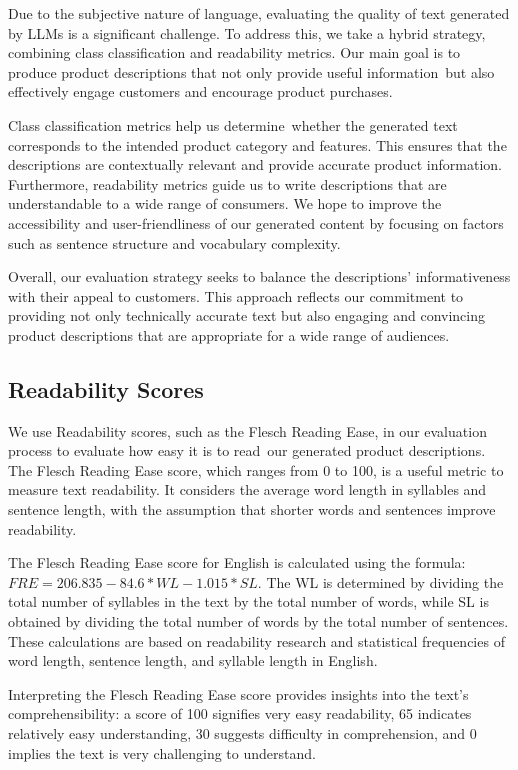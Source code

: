 Due to the subjective nature of language, evaluating the quality of text generated by LLMs is a significant challenge. To address this, we take a hybrid strategy, combining class classification and readability metrics. Our main goal is to produce product descriptions that not only provide useful information but also effectively engage customers and encourage product purchases.

Class classification metrics help us determine whether the generated text corresponds to the intended product category and features. This ensures that the descriptions are contextually relevant and provide accurate product information. Furthermore, readability metrics guide us to write descriptions that are understandable to a wide range of consumers. We hope to improve the accessibility and user-friendliness of our generated content by focusing on factors such as sentence structure and vocabulary complexity.

Overall, our evaluation strategy seeks to balance the descriptions' informativeness with their appeal to customers. This approach reflects our commitment to providing not only technically accurate text but also engaging and convincing product descriptions that are appropriate for a wide range of audiences.

\subsection{Readability Scores}

We use Readability scores, such as the Flesch Reading Ease, in our evaluation process to evaluate how easy it is to read our generated product descriptions. The Flesch Reading Ease score, which ranges from 0 to 100, is a useful metric to measure text readability. It considers the average word length in syllables and sentence length, with the assumption that shorter words and sentences improve readability.\cite{RyteWiki}

The Flesch Reading Ease score for English is calculated using the formula: 
$ FRE = 206.835 - 84.6 * WL - 1.015 * SL $. The WL is determined by dividing the total number of syllables in the text by the total number of words, while SL is obtained by dividing the total number of words by the total number of sentences. These calculations are based on readability research and statistical frequencies of word length, sentence length, and syllable length in English.\cite{RyteWiki}

Interpreting the Flesch Reading Ease score provides insights into the text's comprehensibility: a score of 100 signifies very easy readability, 65 indicates relatively easy understanding, 30 suggests difficulty in comprehension, and 0 implies the text is very challenging to understand.\cite{RyteWiki}

